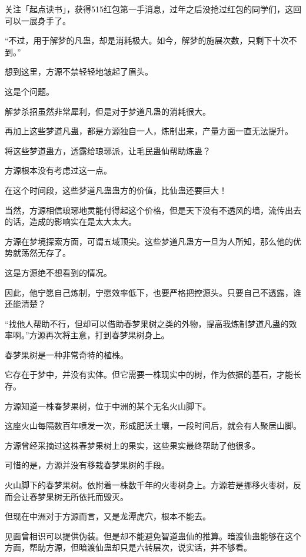 
\begin{this_body}

关注「起点读书」，获得515红包第一手消息，过年之后没抢过红包的同学们，这回可以一展身手了。

“不过，用于解梦的凡蛊，却是消耗极大。如今，解梦的施展次数，只剩下十次不到。”

想到这里，方源不禁轻轻地皱起了眉头。

这是个问题。

解梦杀招虽然非常犀利，但是对于梦道凡蛊的消耗很大。

再加上这些梦道凡蛊，都是方源独自一人，炼制出来，产量方面一直无法提升。

将这些梦道蛊方，透露给琅琊派，让毛民蛊仙帮助炼蛊？

方源根本没有考虑过这一点。

在这个时间段，这些梦道凡蛊蛊方的价值，比仙蛊还要巨大！

当然，方源相信琅琊地灵能付得起这个价格，但是天下没有不透风的墙，流传出去的话，造成的影响实在是太大太大。

方源在梦境探索方面，可谓五域顶尖。这些梦道凡蛊方一旦为人所知，那么他的优势就荡然无存了。

这是方源绝不想看到的情况。

因此，他宁愿自己炼制，宁愿效率低下，也要严格把控源头。只要自己不透露，谁还能清楚？

“找他人帮助不行，但却可以借助春梦果树之类的外物，提高我炼制梦道凡蛊的效率啊。”方源再次将主意，打到春梦果树身上。

春梦果树是一种非常奇特的植株。

它存在于梦中，并没有实体。但它需要一株现实中的树，作为依据的基石，才能长存。

方源知道一株春梦果树，位于中洲的某个无名火山脚下。

这座火山每隔数百年喷发一次，形成肥沃土壤，一段时间后，就会有人聚居山脚。

方源曾经采摘过这株春梦果树上的果实，这些果实最终帮助了他很多。

可惜的是，方源并没有移栽春梦果树的手段。

火山脚下的春梦果树。依附着一株数千年的火枣树身上。方源若是挪移火枣树，反而会让春梦果树无所依托而毁灭。

但现在中洲对于方源而言，又是龙潭虎穴，根本不能去。

见面曾相识可以提供伪装。但是却不能避免智道蛊仙的推算。暗渡仙蛊能够在这个方面，帮助方源，但暗渡仙蛊却只是六转层次，说实话，并不够看。


\end{this_body}
